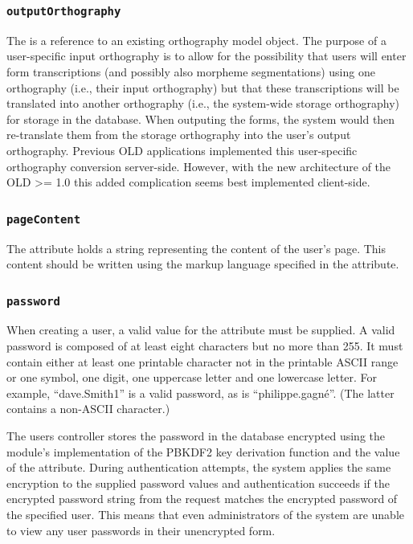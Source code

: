 \documentclass[letterpaper,10pt,english]{sphinxmanual}
\begin{document}
\subsubsection{\texttt{outputOrthography}}
\label{datastructure:id63}
The  is a reference to an existing orthography model
object.  The purpose of a user-specific input orthography is to allow for the
possibility that users will enter form transcriptions (and possibly also
morpheme segmentations) using one orthography (i.e., their input orthography)
but that these transcriptions will be translated into another orthography (i.e.,
the system-wide storage orthography) for storage in the database.  When
outputing the forms, the system would then re-translate them from the storage
orthography into the user's output orthography.  Previous OLD applications
implemented this user-specific orthography conversion server-side.  However,
with the new architecture of the OLD \textgreater{}= 1.0 this added complication seems best
implemented client-side.


\subsubsection{\texttt{pageContent}}
\label{datastructure:id64}
The  attribute holds a string representing the content of the
user's page.  This content should be written using the markup language specified
in the  attribute.


\subsubsection{\texttt{password}}
\label{datastructure:id65}
When creating a user, a valid value for the  attribute must be
supplied.  A valid password is composed of at least eight characters but no more
than 255.  It must contain either at least one printable character not in the
printable ASCII range or one symbol, one digit, one uppercase letter and one
lowercase letter.  For example, ``dave.Smith1'' is a valid password, as is
``philippe.gagné''.  (The latter contains a non-ASCII character.)

The users controller stores the password in the database encrypted using the
 module's implementation of the PBKDF2 key derivation function and
the value of the  attribute.  During authentication attempts, the system
applies the same encryption to the supplied password values and authentication
succeeds if the encrypted password string from the request matches the encrypted
password of the specified user.  This means that even administrators of the
system are unable to view any user passwords in their unencrypted form.
\end{document}
